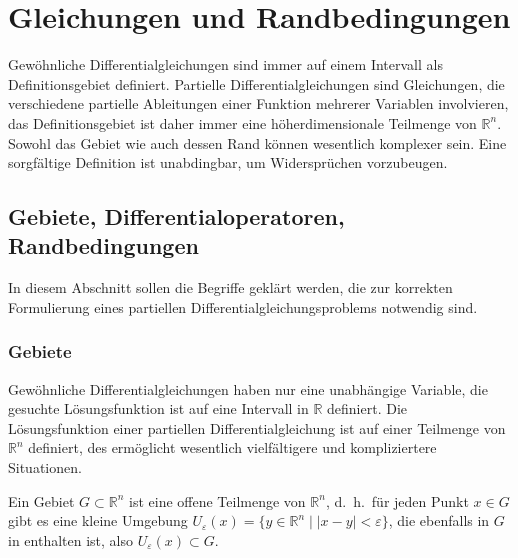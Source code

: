 %
%
%
\section{Gleichungen und Randbedingungen
\label{buch:pde:section:gleichungen-und-randbedingungen}}
Gewöhnliche Differentialgleichungen sind immer auf einem
Intervall als Definitionsgebiet definiert.
Partielle Differentialgleichungen sind Gleichungen, die verschiedene
partielle Ableitungen einer Funktion mehrerer Variablen involvieren,
das Definitionsgebiet ist daher immer eine höherdimensionale Teilmenge 
von $\mathbb{R}^n$.
Sowohl das Gebiet wie auch dessen Rand können wesentlich komplexer sein.
Eine sorgfältige Definition ist unabdingbar, um Widersprüchen vorzubeugen.

%
%
\subsection{Gebiete, Differentialoperatoren, Randbedingungen}
In diesem Abschnitt sollen die Begriffe geklärt werden, die zur
korrekten Formulierung eines partiellen Differentialgleichungsproblems
notwendig sind.

%
%
\subsubsection{Gebiete}
Gewöhnliche Differentialgleichungen haben nur eine unabhängige
Variable, die gesuchte Lösungsfunktion ist auf eine 
Intervall in $\mathbb{R}$ definiert.
Die Lösungsfunktion einer partiellen Differentialgleichung
ist auf einer Teilmenge von $\mathbb{R}^n$ definiert, des 
ermöglicht wesentlich vielfältigere und kompliziertere
Situationen.

\begin{definition}
\label{buch:pde:definition:gebiet}
Ein Gebiet $G\subset\mathbb{R}^n$ ist eine offene Teilmenge
von $\mathbb{R}^n$, d.~h.~für jeden Punkt $x\in G$ gibt es
eine kleine Umgebung
\(
U_{\varepsilon}(x)
=
\{y\in\mathbb{R}^n\mid |x-y|<\varepsilon\}
\), die ebenfalls in $G$ in enthalten ist,
also $U_{\varepsilon}(x)\subset G$.
%
\end{definition}

%
%
